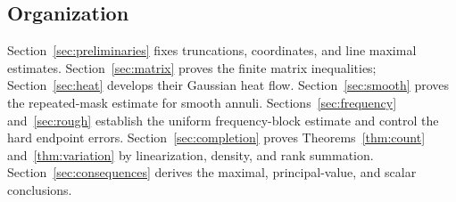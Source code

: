 \subsection{Organization}

Section~\ref{sec:preliminaries} fixes truncations, coordinates, and
line maximal estimates. Section~\ref{sec:matrix} proves the finite
matrix inequalities; Section~\ref{sec:heat} develops their Gaussian
heat flow. Section~\ref{sec:smooth} proves the repeated-mask estimate
for smooth annuli. Sections~\ref{sec:frequency} and~\ref{sec:rough}
establish the uniform frequency-block estimate and control the hard
endpoint errors. Section~\ref{sec:completion} proves
Theorems~\ref{thm:count} and~\ref{thm:variation} by linearization,
density, and rank summation. Section~\ref{sec:consequences} derives
the maximal, principal-value, and scalar conclusions.
